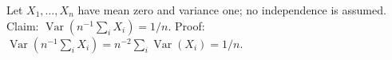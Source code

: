 \documentclass{article}
\begin{document}
Let $X_1,\ldots,X_n$ have mean zero and variance one; no independence is assumed.
Claim: $\operatorname{Var}(n^{-1}\sum_i X_i)=1/n$.
Proof: $\operatorname{Var}(n^{-1}\sum_i X_i)=n^{-2}\sum_i\operatorname{Var}(X_i)=1/n$.
\end{document}
